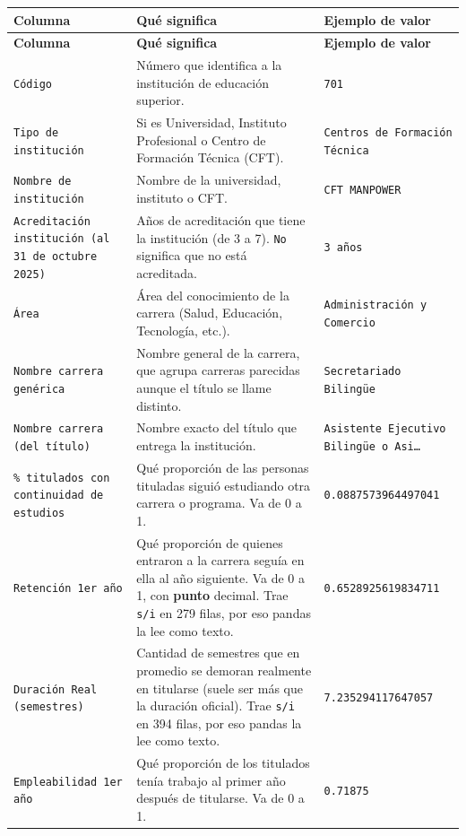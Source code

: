 \documentclass[10.5pt]{article}
\newcommand{\hdr}[1]{\textbf{\color{white}#1}}
\begin{document}
\begin{xltabular}{\linewidth}{@{}p{4.5cm} >{\raggedright\arraybackslash}X p{3.4cm}@{}}
\hdr{Columna} & \hdr{Qué significa} & \hdr{Ejemplo de valor} \\
\endfirsthead
{}\hdr{Columna} & \hdr{Qué significa} & \hdr{Ejemplo de valor} \\
\endhead
\texttt{Código} & Número que identifica a la institución de educación superior. & \texttt{701} \\
\texttt{Tipo de institución} & Si es Universidad, Instituto Profesional o Centro de Formación Técnica (CFT). & \texttt{Centros de Formación Técnica} \\
\texttt{Nombre de institución} & Nombre de la universidad, instituto o CFT. & \texttt{CFT MANPOWER} \\
\texttt{Acreditación institución (al 31 de octubre 2025)} & Años de acreditación que tiene la institución (de 3 a 7). \texttt{No} significa que no está acreditada. & \texttt{3 años} \\
\texttt{Área} & Área del conocimiento de la carrera (Salud, Educación, Tecnología, etc.). & \texttt{Administración y Comercio} \\
\texttt{Nombre carrera genérica} & Nombre general de la carrera, que agrupa carreras parecidas aunque el título se llame distinto. & \texttt{Secretariado Bilingüe} \\
\texttt{Nombre carrera (del título)} & Nombre exacto del título que entrega la institución. & \texttt{Asistente Ejecutivo Bilingüe o Asi…} \\
\texttt{\% titulados con continuidad de estudios} & Qué proporción de las personas tituladas siguió estudiando otra carrera o programa. Va de 0 a 1. & \texttt{0.0887573964497041} \\
\texttt{Retención 1er año} & Qué proporción de quienes entraron a la carrera seguía en ella al año siguiente. Va de 0 a 1, con \textbf{punto} decimal. Trae \texttt{s/\allowbreak{}i} en 279 filas, por eso pandas la lee como texto. & \texttt{0.6528925619834711} \\
\texttt{Duración Real (semestres)} & Cantidad de semestres que en promedio se demoran realmente en titularse (suele ser más que la duración oficial). Trae \texttt{s/\allowbreak{}i} en 394 filas, por eso pandas la lee como texto. & \texttt{7.235294117647057} \\
\texttt{Empleabilidad 1er año} & Qué proporción de los titulados tenía trabajo al primer año después de titularse. Va de 0 a 1. & \texttt{0.71875} \\

\end{xltabular}
\end{document}
